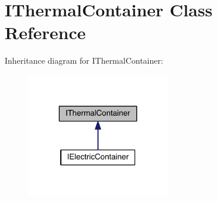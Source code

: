 \hypertarget{class_i_thermal_container}{}\section{I\+Thermal\+Container Class Reference}
\label{class_i_thermal_container}


Inheritance diagram for I\+Thermal\+Container\+:
\nopagebreak
\begin{figure}[H]
\begin{center}
\leavevmode
\includegraphics[width=179pt]{class_i_thermal_container__inherit__graph}
\end{center}
\end{figure}
